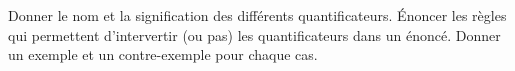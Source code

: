 %
%
 	\begin{tasks}
 		\task Donner le nom et  la signification des différents quantificateurs.
 		\task Énoncer les règles qui permettent d'intervertir (ou pas) les quantificateurs dans un énoncé.
 		\task Donner un exemple et un contre-exemple pour chaque cas.
 	\end{tasks}
 
